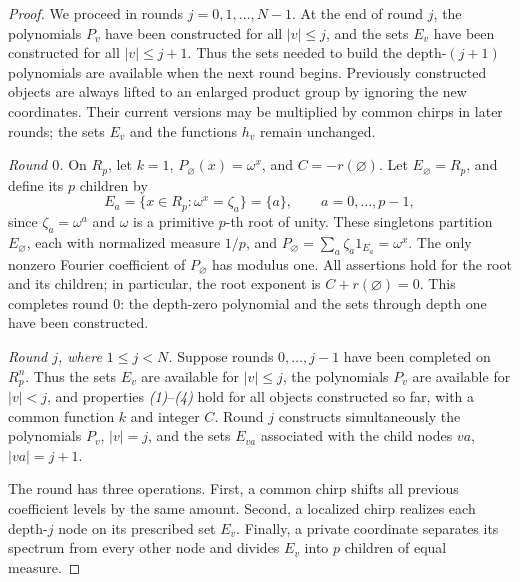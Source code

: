 \documentclass[11pt]{amsart}
\theoremstyle{definition}
\theoremstyle{remark}
\newcommand{\R}{R}
\begin{document}
\begin{proof}
We proceed in rounds \(j=0,1,\ldots,N-1\). At the end of round \(j\),
the polynomials \(P_v\) have been constructed for all \(|v|\leq j\),
and the sets \(E_v\) have been constructed for all \(|v|\leq j+1\).
Thus the sets needed to build the depth-\((j+1)\) polynomials are
available when the next round begins. Previously constructed objects
are always lifted to an enlarged product group by ignoring the new
coordinates. Their current versions may be multiplied by common
chirps in later rounds; the sets \(E_v\) and the functions \(h_v\)
remain unchanged.

\emph{Round \(0\).}
On \(\R_p\), let \(k=1\), \(P_\varnothing(x)=\omega^x\), and
\(C=-r(\varnothing)\). 
Let \(E_\varnothing=\R_p\), and define its
\(p\) children by
\[
 E_a=\{x\in\R_p:\omega^x=\zeta_a\}=\{a\},
 \qquad a=0,\ldots,p-1,
\]
since \(\zeta_a=\omega^a\) and \(\omega\) is a primitive \(p\)-th
root of unity. These singletons partition \(E_\varnothing\), each
with normalized measure \(1/p\), and
\(P_\varnothing=\sum_a\zeta_a1_{E_a}=\omega^x\).
The only nonzero Fourier coefficient of \(P_\varnothing\) has modulus one.
All assertions hold for the root and its children; in particular,
the root exponent is \(C+r(\varnothing)=0\).
This completes round \(0\): the depth-zero polynomial and the sets
through depth one have been constructed.

\emph{Round \(j\), where \(1\leq j<N\).}
Suppose rounds \(0,\ldots,j-1\) have been completed on \(\R_p^n\).
Thus the sets \(E_v\) are available for \(|v|\leq j\), the
polynomials \(P_v\) are available for \(|v|<j\), and properties
\emph{(1)}--\emph{(4)} hold for all objects constructed so far, with
a common function \(k\) and integer \(C\). Round \(j\) constructs
simultaneously the polynomials \(P_v\), \(|v|=j\), and the sets
\(E_{va}\) associated with the child nodes \(va\), \(|va|=j+1\).

The round has three operations. First, a common chirp shifts all
previous coefficient levels by the same amount. Second, a localized
chirp realizes each depth-\(j\) node on its prescribed set \(E_v\).
Finally, a private coordinate separates its spectrum from every other
node and divides \(E_v\) into \(p\) children of equal measure.


\end{proof}
\end{document}
